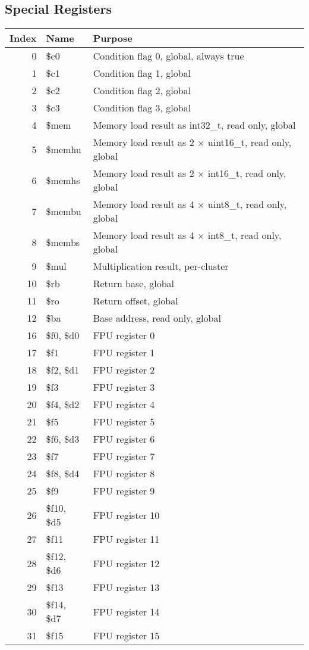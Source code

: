 \documentclass[10pt,a4paper]{article}
\begin{document}
\subsection{Special Registers}

\begin{tabular}{rll}
  \toprule
  Index & Name & Purpose \\
  \midrule
  0 & \$c0 & Condition flag 0, global, always true \\
  1 & \$c1 & Condition flag 1, global \\
  2 & \$c2 & Condition flag 2, global \\
  3 & \$c3 & Condition flag 3, global \\
  \cmidrule{1-3}
  4 & \$mem & Memory load result as int32\_t, read only, global \\
  5 & \$memhu & Memory load result as 2 $\times$ uint16\_t, read only, global \\
  6 & \$memhs & Memory load result as 2 $\times$ int16\_t, read only, global \\
  7 & \$membu & Memory load result as 4 $\times$ uint8\_t, read only, global \\
  8 & \$membs & Memory load result as 4 $\times$ int8\_t, read only, global \\
  \cmidrule{1-3}
  9 & \$mul & Multiplication result, per-cluster \\
  \cmidrule{1-3}
  10 & \$rb & Return base, global \\
  11 & \$ro & Return offset, global \\
  12 & \$ba & Base address, read only, global \\
  \cmidrule{1-3}
  16 & \$f0, \$d0 & FPU register 0 \\
  17 & \$f1 & FPU register 1 \\
  18 & \$f2, \$d1 & FPU register 2 \\
  19 & \$f3 & FPU register 3 \\
  20 & \$f4, \$d2 & FPU register 4 \\
  21 & \$f5 & FPU register 5 \\
  22 & \$f6, \$d3 & FPU register 6 \\
  23 & \$f7 & FPU register 7 \\
  24 & \$f8, \$d4 & FPU register 8 \\
  25 & \$f9 & FPU register 9 \\
  26 & \$f10, \$d5 & FPU register 10 \\
  27 & \$f11 & FPU register 11 \\
  28 & \$f12, \$d6 & FPU register 12 \\
  29 & \$f13 & FPU register 13 \\
  30 & \$f14, \$d7 & FPU register 14 \\
  31 & \$f15 & FPU register 15 \\
  \bottomrule
\end{tabular}
\end{document}
